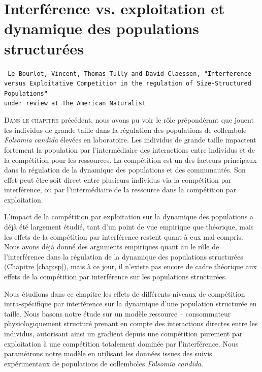 \chapter[Interférence vs. exploitation et dynamique des populations
structurées][Interférence et populations structurées]{Interférence vs.
exploitation et dynamique des populations structurées}
\label{chap:amnat}

\vspace{2cm}
\begin{Spacing}{1}
\texttt{
Le Bourlot, Vincent, Thomas Tully and David Claessen, "Interference versus
Exploitative Competition in the regulation of Size-Structured Populations"\\
under review at The American Naturalist
}
\end{Spacing}
\vspace{2cm}


\lettrine[lines=3]{D}{ans le chapitre} précédent, nous avons pu voir le rôle
prépondérant que jouent les individus de grande taille dans la régulation des
populations de collembole \textit{Folsomia candida} élevées en laboratoire. Les
individus de grande taille impactent fortement la population par l'intermédiaire
des interactions entre individus et de la compétition pour les ressources. La
compétition est un des facteurs principaux dans la régulation de la dynamique
des populations et des communautés. Son effet peut être soit direct entre
plusieurs individus via la compétition par interférence, ou par l'intermédiaire
de la ressource dans la compétition par exploitation.

L'impact de la compétition par exploitation sur la dynamique des populations a
déjà été largement étudié, tant d'un point de vue empirique que théorique, mais
les effets de la compétition par interférence restent quant à eux mal compris.
Nous avons déjà donné des arguments empiriques quant au le rôle de
l'interférence dans la régulation de la dynamique des populations structurées
(Chapitre \ref{chap:sp}), mais à ce jour, il n'existe pas encore de cadre
théorique aux effets de la compétition par interférence sur les populations structurées.

Nous étudions dans ce chapitre les effets de différents niveaux de compétition
intra-spécifique par interférence sur la dynamique d'une population structurée
en taille. Nous basons notre étude sur un modèle ressource -- consommateur
physiologiquement structuré \autocites[modèle de ][]{kooijman1984a} prenant
en compte des interactions directes entre les individus, autorisant ainsi un
gradient depuis une compétition purement par exploitation à une compétition
totalement dominée par l'interférence. Nous paramétrons notre modèle en
utilisant les données issues des suivis expérimentaux de populations de
collemboles \textit{Folsomia candida}.

